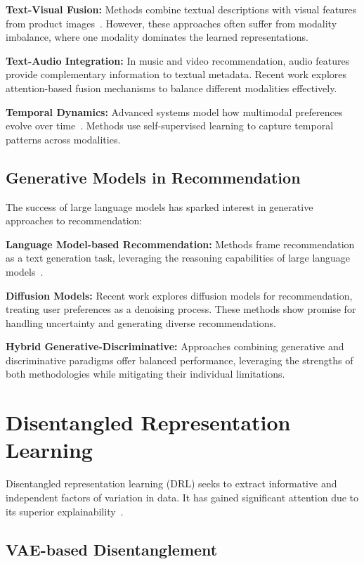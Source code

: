 \textbf{Text-Visual Fusion:} Methods combine textual descriptions with visual features from product images~\cite{liu2020category, yu2022boost}. However, these approaches often suffer from modality imbalance, where one modality dominates the learned representations.

\textbf{Text-Audio Integration:} In music and video recommendation, audio features provide complementary information to textual metadata. Recent work explores attention-based fusion mechanisms to balance different modalities effectively.

\textbf{Temporal Dynamics:} Advanced systems model how multimodal preferences evolve over time~\cite{zhou2024temporal}. Methods use self-supervised learning to capture temporal patterns across modalities.

\subsection{Generative Models in Recommendation}

The success of large language models has sparked interest in generative approaches to recommendation:

\textbf{Language Model-based Recommendation:} Methods frame recommendation as a text generation task, leveraging the reasoning capabilities of large language models~\cite{rajput2023recommender}.

\textbf{Diffusion Models:} Recent work explores diffusion models for recommendation, treating user preferences as a denoising process. These methods show promise for handling uncertainty and generating diverse recommendations.

\textbf{Hybrid Generative-Discriminative:} Approaches combining generative and discriminative paradigms offer balanced performance, leveraging the strengths of both methodologies while mitigating their individual limitations.

\section{Disentangled Representation Learning}

Disentangled representation learning (DRL) seeks to extract informative and independent factors of variation in data. It has gained significant attention due to its superior explainability~\cite{wang2024disentangled}.

\subsection{VAE-based Disentanglement}


